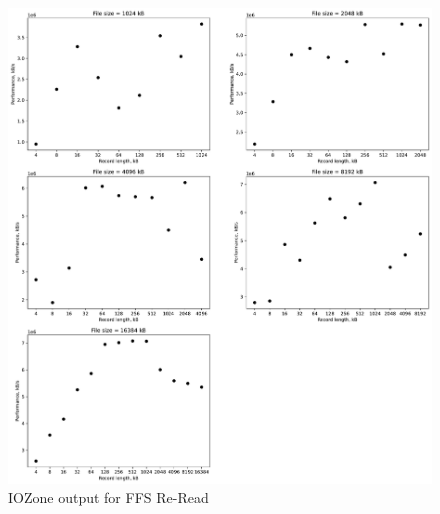 \begin{figure}[!htb]
	\label{fig:app_bench_ffs_re_read}
	\begin{center}
		\includegraphics[width=1.0\textwidth]{figures/benchmarking/ffs/Re-Read.pdf}
	\end{center}
	\caption{IOZone output for FFS Re-Read}
\end{figure}

